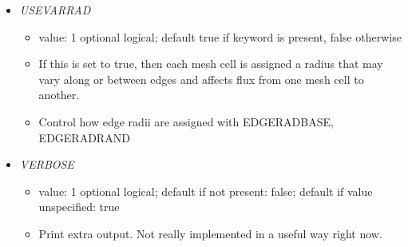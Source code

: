 \documentclass[12pt]{article}
\begin{document}
\begin{itemize}
\begin{itemize}
\end{itemize}
%
\item {\it USEVARRAD}
\begin{itemize}
	\item value: 1 optional logical; default true if keyword is present, false otherwise
	\item If this is set to true, then each mesh cell is assigned a radius that may vary along or between edges and affects flux from one mesh cell to another. 
	\item Control how edge radii are assigned with EDGERADBASE, EDGERADRAND
\end{itemize}
%
\item {\it VERBOSE}
        \begin{itemize}
          \item  value: 1 optional logical; default if not present: false; default if value unspecified: true
          \item Print extra output. Not really implemented in a useful way right now.
        \end{itemize}

\end{itemize}

%
%
\end{document}
